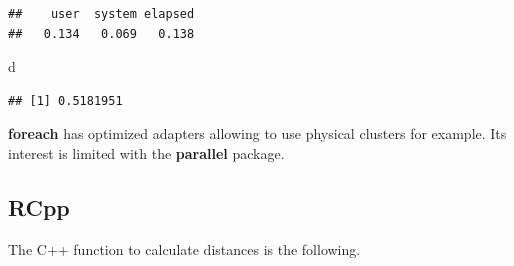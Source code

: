 \documentclass[
  12pt,
  american,
  a4paper,
  extrafontsizes,onecolumn,openright
  ]{memoir}
\newenvironment{Shaded}{\begin{snugshade}}{\end{snugshade}}
\newcommand{\NormalTok}[1]{#1}
\begin{document}
\begin{verbatim}
##    user  system elapsed 
##   0.134   0.069   0.138
\end{verbatim}

\begin{Shaded}
\begin{Highlighting}[]
\NormalTok{d}
\end{Highlighting}
\end{Shaded}

\begin{verbatim}
## [1] 0.5181951
\end{verbatim}

\normalsize

\textbf{foreach} has optimized adapters allowing to use physical clusters for example.
Its interest is limited with the \textbf{parallel} package.

\hypertarget{rcpp}{%
\subsection{RCpp}\label{rcpp}}

The C++ function to calculate distances is the following.

\scriptsize
\end{document}
